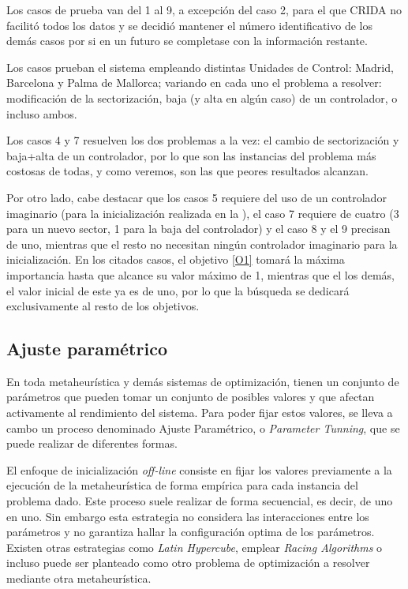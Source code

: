 Los casos de prueba van del 1 al 9, a excepción del caso 2, para el que \gls{CRIDA} no facilitó todos los datos y se decidió mantener el número identificativo de los demás casos por si en un futuro se completase con la información restante.

Los casos prueban el sistema empleando distintas Unidades de Control: Madrid, Barcelona y Palma de Mallorca; variando en cada uno el problema a resolver: modificación de la sectorización, baja (y alta en algún caso) de un controlador, o incluso ambos.

Los casos 4 y 7 resuelven los dos problemas a la vez: el cambio de sectorización y baja+alta de un controlador, por lo que son las instancias del problema más costosas de todas, y como veremos, son las que peores resultados alcanzan. %

Por otro lado, cabe destacar que los casos 5 requiere del uso de un controlador imaginario (para la inicialización realizada en la \faseuno{}), el caso 7 requiere de cuatro (3 para un nuevo sector, 1 para la baja del controlador) y el caso 8 y el 9 precisan de uno, mientras que el resto no necesitan ningún controlador imaginario para la inicialización. En los citados casos, el objetivo \ref{O1} tomará la máxima importancia hasta que alcance su valor máximo de 1, mientras que el los demás, el valor inicial de este ya es de uno, por lo que la búsqueda se dedicará exclusivamente al resto de los objetivos.


\subsection{Ajuste paramétrico}
En toda metaheurística y demás sistemas de optimización, tienen un conjunto de parámetros que pueden tomar un conjunto de posibles valores y que afectan activamente al rendimiento del sistema. Para poder fijar estos valores, se lleva a cambo un proceso denominado Ajuste Paramétrico, o \textit{Parameter Tunning}, que se puede realizar de diferentes formas.

El enfoque de inicialización \textit{off-line} consiste en fijar los valores previamente a la ejecución de la metaheurística de forma empírica para cada instancia del problema dado. Este proceso suele realizar de forma secuencial, es decir, de uno en uno. Sin embargo esta estrategia no considera las interacciones entre los parámetros y no garantiza hallar la configuración optima de los parámetros. Existen otras estrategias como \textit{Latin Hypercube}, emplear \textit{Racing Algorithms} o incluso puede ser planteado como otro problema de optimización a resolver mediante otra metaheurística.

